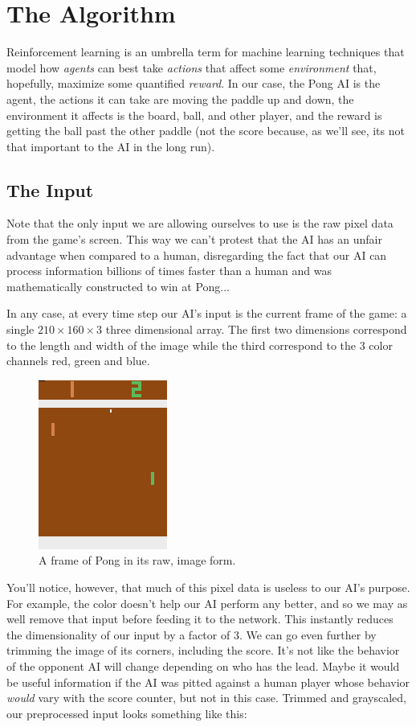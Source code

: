 \documentclass{article}
\begin{document}
\section{The Algorithm}
Reinforcement learning is an umbrella term for machine learning techniques that model how \textit{agents} can best take \textit{actions} that affect some \textit{environment} that, hopefully, maximize some quantified \textit{reward}. In our case, the Pong AI is the agent, the actions it can take are moving the paddle up and down, the environment it affects is the board, ball, and other player, and the reward is getting the ball past the other paddle (not the score because, as we'll see, its not that important to the AI in the long run).

\subsection{The Input}
Note that the only input we are allowing ourselves to use is the raw pixel data from the game's screen. This way we can't protest that the AI has an unfair advantage when compared to a human, disregarding the fact that our AI can process information billions of times faster than a human and was mathematically constructed to win at Pong...

In any case, at every time step our AI's input is the current frame of the game: a single $210\times160\times 3$ three dimensional array. The first two dimensions correspond to the length and width of the image while the third correspond to the 3 color channels red, green and blue.

\begin{figure}[h]
\centering
\includegraphics{frame}
\caption*{A frame of Pong in its raw, image form.}
\end{figure}

You'll notice, however, that much of this pixel data is useless to our AI's purpose. For example, the color doesn't help our AI perform any better, and so we may as well remove that input before feeding it to the network. This instantly reduces the dimensionality of our input by a factor of 3. We can go even further by trimming the image of its corners, including the score. It's not like the behavior of the opponent AI will change depending on who has the lead. Maybe it would be useful information if the AI was pitted against a human player whose behavior \textit{would} vary with the score counter, but not in this case. Trimmed and grayscaled, our preprocessed input looks something like this:
\end{document}
